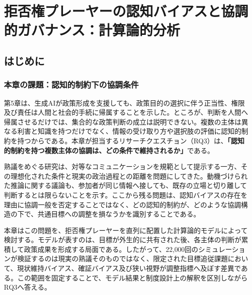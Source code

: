 
\chapter{拒否権プレーヤーの認知バイアスと協調的ガバナンス：計算論的分析}
\label{chap:cognitive_bias}

\section{はじめに}
\label{sec:ch3_intro}

\subsection{本章の課題：認知的制約下の協調条件}

第5章は、生成AIが政策形成を支援しても、政策目的の選択に伴う正当性、権限及び責任は人間と社会的手続に帰属することを示した。ところが、判断を人間へ帰属させるだけでは、集合的な政策判断の成立は説明できない。複数の主体は異なる利害と知識を持つだけでなく、情報の受け取り方や選択肢の評価に認知的制約を持つからである。本章が担当するリサーチクエスチョン（RQ3）は、\textbf{「認知的制約を持つ複数主体の協調は、どの条件で維持されるか」}である。

熟議をめぐる研究は、対等なコミュニケーションを規範として提示する一方、その理想化された条件と現実の政治過程との距離を問題にしてきた\cite{rienstra2007weakening}。動機づけられた推論に関する議論も、参加者が同じ情報へ接しても、既存の立場と切り離して判断するとは限らないことを示す\cite{bagg2018deliberation}。ここから残る問題は、認知バイアスの存在を理由に協調一般を否定することではなく、どの認知的制約が、どのような協調構造の下で、共通目標への調整を損なうかを識別することである。

本章はこの問題を、拒否権プレーヤーを直列に配置した計算論的モデルによって検討する。モデルが表すのは、目標が外生的に共有された後、各主体の判断が累積して政策成果を形成する局面である。したがって、22,000回のシミュレーションが検証するのは現実の熟議そのものではなく、限定された目標追従課題において、現状維持バイアス、確証バイアス及び狭い視野が調整指標へ及ぼす差異である。この範囲を固定することで、モデル結果と制度設計上の解釈を区別しながらRQ3へ答える。

